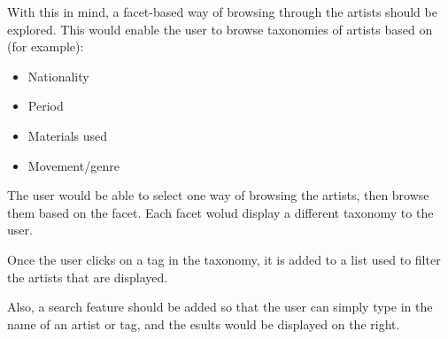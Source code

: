 \documentclass[11pt]{article}
\begin{document}
With this in mind, a facet-based way of browsing through the artists should be explored. This would enable the user to browse taxonomies of artists based on (for example):
\begin{itemize}[noitemsep]
  \item Nationality
  \item Period
  \item Materials used
  \item Movement/genre
\end{itemize}

The user would be able to select one way of browsing the artists, then browse them based on the facet. Each facet wolud display a different taxonomy to the user.

Once the user clicks on a tag in the taxonomy, it is added to a list used to filter the artists that are displayed.

Also, a search feature should be added so that the user can simply type in the name of an artist or tag, and the esults would be displayed on the right.



\end{document}
